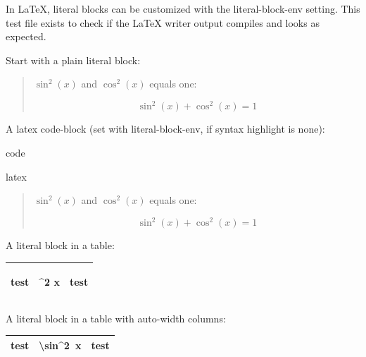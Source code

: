 \documentclass[a4paper]{article}
\newlength{\DUtablewidth} %
\newlength{\ttemwidth}
\begin{document}
In LaTeX, literal blocks can be customized with the \textquotedbl{}literal-block-env\textquotedbl{}
setting. This test file exists to check if the LaTeX writer output compiles
and looks as expected.

Start with a plain literal block:

\begin{quote}
\begin{verbatimtab}
$\sin^2(x)$ and $\cos^2(x)$ equals one:

\[
   \sin^2(x) + \cos^2(x) = 1 %
\]
\end{verbatimtab}
\end{quote}

A latex \textquotedbl{}code-block\textquotedbl{} (set with \textquotedbl{}literal-block-env\textquotedbl{}, if syntax
highlight is \textquotedbl{}none\textquotedbl{}):

\begin{DUclass}{code}
\begin{DUclass}{latex}
\begin{quote}
\begin{verbatimtab}
$\sin^2(x)$ and $\cos^2(x)$ equals one:

\[
   \sin^2(x) + \cos^2(x) = 1 %
\]
\end{verbatimtab}
\end{quote}
\end{DUclass}
\end{DUclass}

A literal block in a table:

\setlength{\DUtablewidth}{\linewidth}
\begin{longtable*}[c]{|p{0.063\DUtablewidth}|p{0.145\DUtablewidth}|p{0.063\DUtablewidth}|}
\hline

test
 & 
\begin{minipage}{8\ttemwidth}
\begin{verbatimtab}
\sin^2 x
\end{verbatimtab}
\end{minipage}
 & 
test
 \\
\hline
\end{longtable*}

A literal block in a table with auto-width columns:

\begin{longtable*}[c]{|l|l|l|}
\hline
test & 
\ttfamily\raggedright
\textbackslash{}sin\textasciicircum{}2~x
 & test \\
\hline
\end{longtable*}
\end{document}

